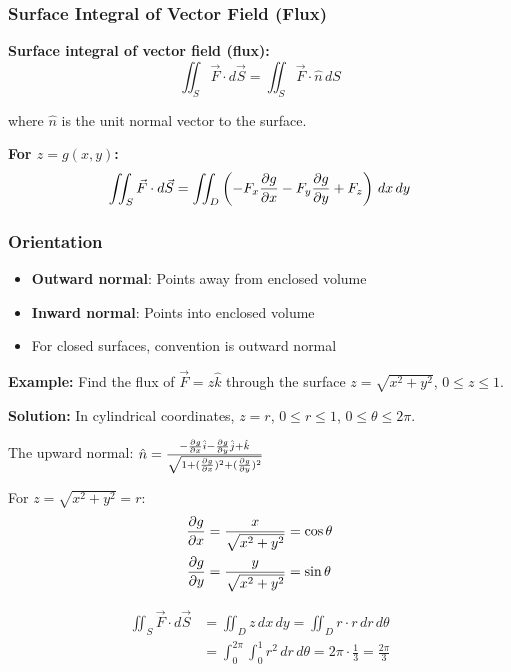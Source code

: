 \documentclass[12pt,a4paper]{article}
\begin{document}
\subsubsection{Surface Integral of Vector Field (Flux)}
\begin{formulabox}
\textbf{Surface integral of vector field (flux):}
\begin{equation}
\iint_S \vec{F} \cdot d\vec{S} = \iint_S \vec{F} \cdot \hat{n} \, dS
\end{equation}

where $\hat{n}$ is the unit normal vector to the surface.

\textbf{For $z = g(x,y)$:}
\begin{equation}
\iint_S \vec{F} \cdot d\vec{S} = \iint_D \left(-F_x \pdv{g}{x} - F_y \pdv{g}{y} + F_z\right) \, dx \, dy
\end{equation}
\end{formulabox}

\subsubsection{Orientation}
\begin{itemize}
    \item \textbf{Outward normal}: Points away from enclosed volume
    \item \textbf{Inward normal}: Points into enclosed volume
    \item For closed surfaces, convention is outward normal
\end{itemize}

\begin{examplebox}
\textbf{Example:} Find the flux of $\vec{F} = z\hat{k}$ through the surface $z = \sqrt{x^2 + y^2}$, $0 \leq z \leq 1$.

\textbf{Solution:} In cylindrical coordinates, $z = r$, $0 \leq r \leq 1$, $0 \leq \theta \leq 2\pi$.

The upward normal: $\hat{n} = \frac{-\pdv{g}{x}\hat{i} - \pdv{g}{y}\hat{j} + \hat{k}}{\sqrt{1 + (\pdv{g}{x})^2 + (\pdv{g}{y})^2}}$

For $z = \sqrt{x^2 + y^2} = r$:
\begin{align}
\pdv{g}{x} &= \frac{x}{\sqrt{x^2 + y^2}} = \cos\theta \\
\pdv{g}{y} &= \frac{y}{\sqrt{x^2 + y^2}} = \sin\theta
\end{align}

\begin{align}
\iint_S \vec{F} \cdot d\vec{S} &= \iint_D z \, dx \, dy = \iint_D r \cdot r \, dr \, d\theta \\
&= \int_0^{2\pi} \int_0^1 r^2 \, dr \, d\theta = 2\pi \cdot \frac{1}{3} = \frac{2\pi}{3}
\end{align}
\end{examplebox}
\end{document}
